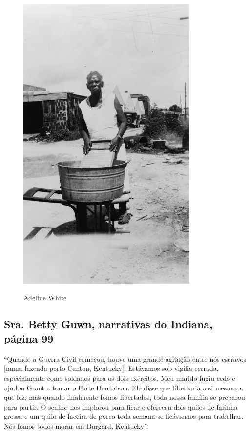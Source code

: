 \pagebreak
\thispagestyle{empty}
\begin{figure}[!ht]
\centering
 \includegraphics[width=90mm]{./imgs/adlinewhite_recorte.jpg} \label{img23}
\caption{Adeline White}
\end{figure}

\subsection{Sra. Betty Guwn, narrativas do Indiana, página 99} \label{ref117}

``Quando a Guerra Civil começou, houve uma grande agitação entre nós
escravos {[}numa fazenda perto Canton, Kentucky{]}. Estávamos sob
vigília cerrada, especialmente como soldados para os dois exércitos. Meu
marido fugiu cedo e ajudou Grant a tomar o Forte Donaldson. Ele disse
que libertaria a si mesmo, o que fez; mas quando finalmente fomos
libertados, toda nossa família se preparou para partir. O senhor nos
implorou para ficar e ofereceu dois quilos de farinha grossa e um quilo
de faceira de porco toda semana se ficássemos para trabalhar. Nós fomos
todos morar em Burgard, Kentucky''.

